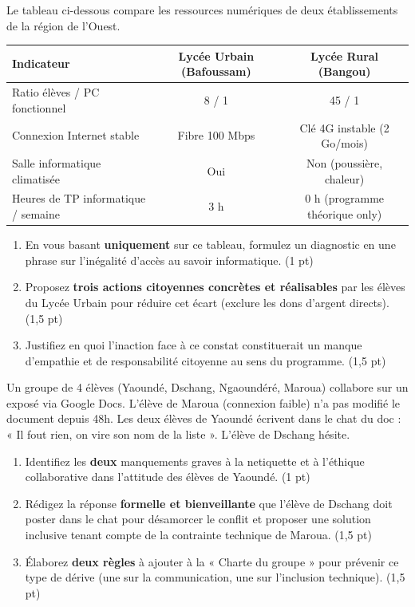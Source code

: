 \documentclass[11pt]{article}
\begin{document}
\begin{exercice}
Le tableau ci-dessous compare les ressources numériques de deux établissements de la région de l'Ouest.
\begin{center}
\begin{tabular}{|l|c|c|}
\hline
\textbf{Indicateur} & \textbf{Lycée Urbain (Bafoussam)} & \textbf{Lycée Rural (Bangou)} \\
\hline
Ratio élèves / PC fonctionnel & 8 / 1 & 45 / 1 \\
Connexion Internet stable & Fibre 100 Mbps & Clé 4G instable (2 Go/mois) \\
Salle informatique climatisée & Oui & Non (poussière, chaleur) \\
Heures de TP informatique / semaine & 3 h & 0 h (programme théorique only) \\
\hline
\end{tabular}
\end{center}
\begin{enumerate}
    \item En vous basant \textbf{uniquement} sur ce tableau, formulez un diagnostic en une phrase sur l'inégalité d'accès au savoir informatique. (1 pt)
    \item Proposez \textbf{trois actions citoyennes concrètes et réalisables} par les élèves du Lycée Urbain pour réduire cet écart (exclure les dons d'argent directs). (1,5 pt)
    \item Justifiez en quoi l'inaction face à ce constat constituerait un manque d'empathie et de responsabilité citoyenne au sens du programme. (1,5 pt)
\end{enumerate}
\end{exercice}

\begin{exercice}
Un groupe de 4 élèves (Yaoundé, Dschang, Ngaoundéré, Maroua) collabore sur un exposé via Google Docs. L'élève de Maroua (connexion faible) n'a pas modifié le document depuis 48h. Les deux élèves de Yaoundé écrivent dans le chat du doc : « Il fout rien, on vire son nom de la liste ». L'élève de Dschang hésite.
\begin{enumerate}
    \item Identifiez les \textbf{deux} manquements graves à la netiquette et à l'éthique collaborative dans l'attitude des élèves de Yaoundé. (1 pt)
    \item Rédigez la réponse \textbf{formelle et bienveillante} que l'élève de Dschang doit poster dans le chat pour désamorcer le conflit et proposer une solution inclusive tenant compte de la contrainte technique de Maroua. (1,5 pt)
    \item Élaborez \textbf{deux règles} à ajouter à la « Charte du groupe » pour prévenir ce type de dérive (une sur la communication, une sur l'inclusion technique). (1,5 pt)
\end{enumerate}
\end{exercice}
\end{document}
